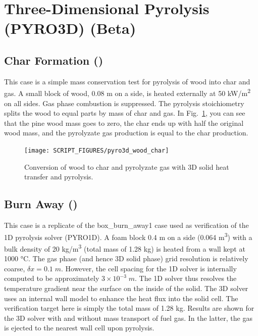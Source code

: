 \documentclass[11pt]{book}
\begin{document}
\section{Three-Dimensional Pyrolysis (PYRO3D) (Beta)}
\label{sec:pyro3d}


\subsection{Char Formation (\texorpdfstring{}{pyro3d\_wood\_char})}
\label{pyro3d_wood_char}

This case is a simple mass conservation test for pyrolysis of wood into char and gas.  A small block of wood, 0.08 m on a side, is heated externally at 50 \si{kW/m^2} on all sides.  Gas phase combustion is suppressed.  The pyrolysis stoichiometry splits the wood to equal parts by mass of char and gas.  In Fig.~\ref{fig:pyro3d_wood_char}, you can see that the pine wood mass goes to zero, the char ends up with half the original wood mass, and the pyrolyzate gas production is equal to the char production.

\begin{figure}[!ht]
	\centering
	\texttt{[image: SCRIPT\_FIGURES/pyro3d\_wood\_char]}
	\caption[PYRO3D char formation (the {\ct pyro3d\_wood\_char} case)]{Conversion of wood to char and pyrolyzate gas with 3D solid heat transfer and pyrolysis.}
	\label{fig:pyro3d_wood_char}
\end{figure}


\subsection{Burn Away (\texorpdfstring{}{box\_burn\_away1\_pyro3d\_vs\_pyro1d})}
\label{box_burn_away1_pyro3d_vs_pyro1d}

This case is a replicate of the {\ct box\_burn\_away1} case used as verification of the 1D pyrolysis solver (PYRO1D).  A foam block 0.4 m on a side (0.064 \si{m^3}) with a bulk density of 20 \si{kg/m^3} (total mass of 1.28 kg) is heated from a wall kept at 1000 \si{\degreeCelsius}.  The gas phase (and hence 3D solid phase) grid resolution is relatively coarse, $\delta x = 0.1 \;\si{m}$.  However, the cell spacing for the 1D solver is internally computed to be approximately $3 \times 10^{-3} \;\si{m}$.  The 1D solver thus resolves the temperature gradient near the surface on the inside of the solid.  The 3D solver uses an internal wall model to enhance the heat flux into the solid cell.  The verification target here is simply the total mass of 1.28 kg.  Results are shown for the 3D solver with and without mass transport of fuel gas.  In the latter, the gas is ejected to the nearest wall cell upon pyrolysis.
\end{document}
